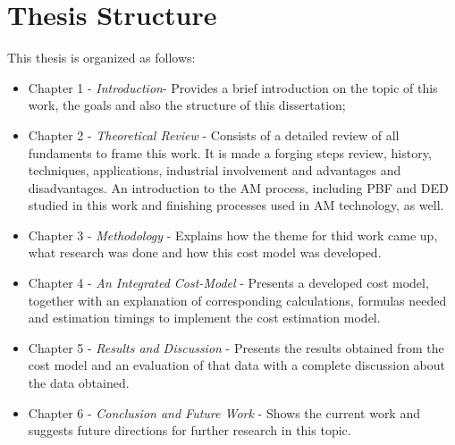 \section{Thesis Structure}
This thesis is organized as follows: 
\begin{itemize}
    \item Chapter 1 -  \emph{Introduction}- Provides a brief introduction on the topic of this work, the goals and also the structure of this dissertation;
    \item Chapter 2 - \emph{Theoretical Review} - Consists of a detailed review of all fundaments to frame this work. It is made a forging steps review, history, techniques, applications, industrial involvement and advantages and disadvantages. An introduction to the \ac{AM} process, including \ac{PBF} and \ac{DED} studied in this work and finishing processes used in \ac{AM} technology, as well.
    \item Chapter 3 - \emph{Methodology} - Explains how the theme for thid work came up, what research was done and how this cost model was developed.
    \item Chapter 4 - \emph{An Integrated Cost-Model} - Presents a developed cost model, together with an explanation of corresponding calculations, formulas needed and estimation timings to implement the cost estimation model.
    \item Chapter 5 - \emph{Results and Discussion} - Presents the results obtained from the cost model and an evaluation of that data with a complete discussion about the data obtained.
    \item Chapter  6 - \emph{Conclusion and Future Work} - Shows the current work and suggests future directions for further research in this topic.
\end{itemize}

